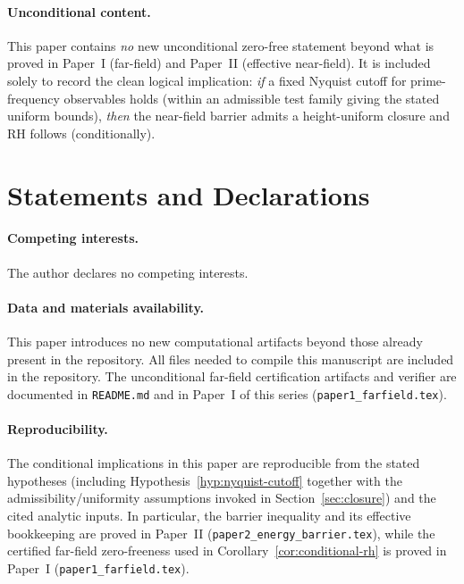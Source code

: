 \documentclass[11pt]{article}
\begin{document}
\paragraph{Unconditional content.}
This paper contains \emph{no} new unconditional zero-free statement beyond what is proved in Paper~I (far-field) and Paper~II (effective near-field).
It is included solely to record the clean logical implication: \emph{if} a fixed Nyquist cutoff for prime-frequency observables holds (within an admissible test family giving the stated uniform bounds), \emph{then} the near-field barrier admits a height-uniform closure and RH follows (conditionally).

\section*{Statements and Declarations}

\paragraph{Competing interests.}
The author declares no competing interests.

\paragraph{Data and materials availability.}
This paper introduces no new computational artifacts beyond those already present in the repository.
All files needed to compile this manuscript are included in the repository.
The unconditional far-field certification artifacts and verifier are documented in \texttt{README.md} and in Paper~I of this series (\texttt{paper1\_farfield.tex}).

\paragraph{Reproducibility.}
The conditional implications in this paper are reproducible from the stated hypotheses (including Hypothesis~\ref{hyp:nyquist-cutoff} together with the admissibility/uniformity assumptions invoked in Section~\ref{sec:closure}) and the cited analytic inputs.
In particular, the barrier inequality and its effective bookkeeping are proved in Paper~II (\texttt{paper2\_energy\_barrier.tex}), while the certified far-field zero-freeness used in Corollary~\ref{cor:conditional-rh} is proved in Paper~I (\texttt{paper1\_farfield.tex}).


\end{document}
